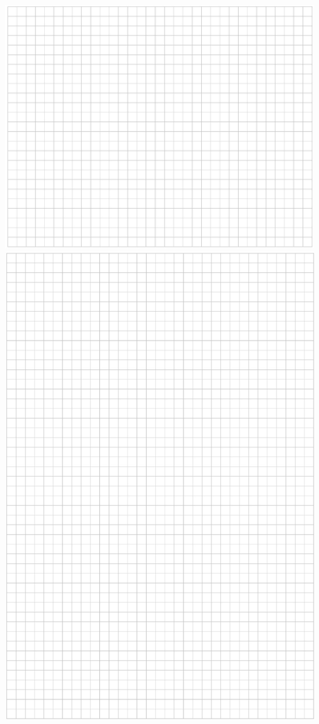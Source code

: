 \documentclass[10pt]{article}
\begin{document}
\includegraphics[max width=\textwidth, center]{2024_11_21_8bf32a7596bd08ca7a9fg-04(1)}\\
\includegraphics[max width=\textwidth, center]{2024_11_21_8bf32a7596bd08ca7a9fg-05}
\end{document}
